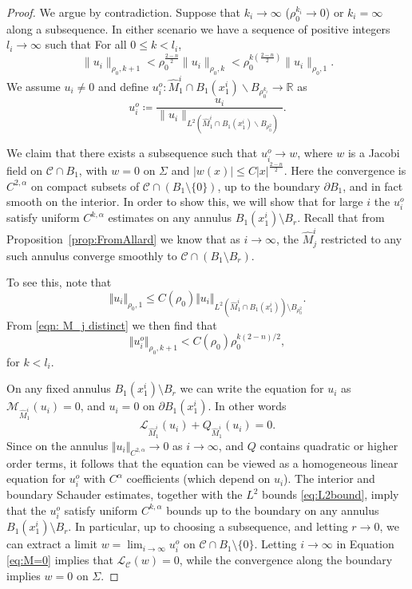 \documentclass[12pt, reqno ]{amsart}
\numberwithin{equation}{section}
\begin{document}
\begin{proof}
We argue by contradiction. Suppose that $k_i\rightarrow \infty$ ($\rho_0^{k_i}\rightarrow 0$) or $k_i=\infty$ along a subsequence. In either scenario we have a sequence of positive integers $l_i\rightarrow \infty$ such that 
For all $0\leq k<l_i$, 
\begin{equation}\label{eqn: M_j distinct}
 \|u_i\|_{\rho_0, k+1}< \rho_0^{\frac{2-n}{2}}\|u_i\|_{\rho_0, k}<\rho_0^{k(\frac{2-n}{2})}\|u_i\|_{\rho_0, 1}.
\end{equation}
We assume $u_i\neq 0$ and define $u_i^o:\hat M_1^i\cap B_1(x_1^i)\backslash B_{\rho_0^{k_i}}\rightarrow \mathbb R$ as
$$ u_i^o\coloneqq\frac{u_i}{\|u_i\|_{L^2(\hat M_1^i\cap B_1(x_1^i)\backslash B_{\rho_0^2})}}. $$

We claim that there exists a subsequence such that $u_i^o \rightarrow w$, where $w$ is a Jacobi field on $\mathcal C \cap B_1$, with $w=0$ on $\Sigma$ and $|w(x)| \leq C |x|^{\frac{2-n}{2}}$. Here the convergence is $C^{2,\alpha}$ on compact subsets of $\mathcal{C}\cap (B_1\setminus \{0\})$, up to the boundary $\partial B_1$, and in fact smooth on the interior. In order to show this, we will show that for large $i$ the $u^o_i$ satisfy uniform $C^{k,\alpha}$ estimates on any annulus $B_1(x^i_1)\setminus B_r$. Recall that from Proposition~\ref{prop:FromAllard} we know that as $i\to \infty$, the $\hat{M}^i_j$ restricted to any such annulus converge smoothly to $\mathcal{C}\cap (B_1\setminus B_r)$. 

To see this, note that
\[ \Vert u_i\Vert_{\rho_0,1} \leq C(\rho_0) \Vert u_i\Vert_{L^2(\hat{M}^i_1\cap B_1(x^i_1))\setminus B_{\rho_0^2}}. \]
From \eqref{eqn: M_j distinct} we then find that
\begin{equation}\label{eq:L2bound} \Vert u^o_i\Vert_{\rho_0, k+1} < C(\rho_0) \rho_0^{k(2-n)/2}, 
\end{equation}
for $k < l_i$. 

On any fixed annulus $B_1(x^i_1)\setminus B_r$ we can write the equation for $u_i$ as $\mathcal{M}_{\hat{M}_1^i}(u_i)=0$, and $u_i=0$ on $\partial B_1(x^i_1)$. In other words
\begin{equation}\label{eq:M=0} \mathcal{L}_{\hat{M}^i_1}(u_i) + Q_{\hat{M}^i_1}(u_i) = 0. 
\end{equation}
Since on the annulus $\Vert u_i\Vert_{C^{2,\alpha}}\to 0$ as $i\to\infty$, and $Q$ contains quadratic or higher order terms, it follows that the equation can be viewed as a homogeneous linear equation for $u_i^o$ with $C^\alpha$ coefficients (which depend on $u_i$). The interior and boundary Schauder estimates, together with the $L^2$ bounds \eqref{eq:L2bound}, imply that the $u_i^o$ satisfy uniform $C^{k,\alpha}$ bounds up to the boundary on any annulus $B_1(x^i_1)\setminus B_r$. In particular, up to choosing a subsequence, and letting $r\to 0$, we can extract a limit $w = \lim_{i\to\infty} u^o_i$ on $\mathcal{C}\cap B_1\setminus \{0\}$. Letting $i\to \infty$ in Equation \eqref{eq:M=0} implies that  $\mathcal{L}_{\mathcal{C}}(w)=0$, while the convergence along the boundary implies $w=0$ on $\Sigma$. 


\end{proof}
\end{document}
